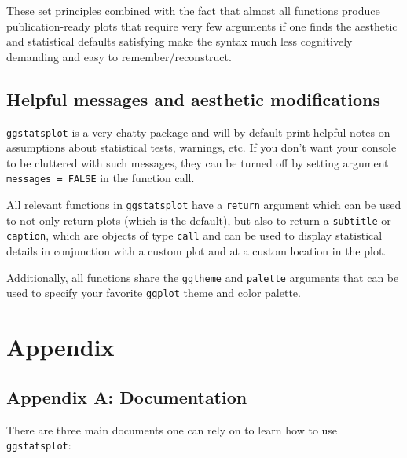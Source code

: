 \documentclass[]{article}
\begin{document}
These set principles combined with the fact that almost all functions
produce publication-ready plots that require very few arguments if one
finds the aesthetic and statistical defaults satisfying make the syntax
much less cognitively demanding and easy to remember/reconstruct.

\hypertarget{helpful-messages-and-aesthetic-modifications}{%
\subsection{Helpful messages and aesthetic
modifications}\label{helpful-messages-and-aesthetic-modifications}}

\texttt{ggstatsplot} is a very chatty package and will by default print
helpful notes on assumptions about statistical tests, warnings, etc. If
you don't want your console to be cluttered with such messages, they can
be turned off by setting argument \texttt{messages\ =\ FALSE} in the
function call.

All relevant functions in \texttt{ggstatsplot} have a \texttt{return}
argument which can be used to not only return plots (which is the
default), but also to return a \texttt{subtitle} or \texttt{caption},
which are objects of type \texttt{call} and can be used to display
statistical details in conjunction with a custom plot and at a custom
location in the plot.

Additionally, all functions share the \texttt{ggtheme} and
\texttt{palette} arguments that can be used to specify your favorite
\texttt{ggplot} theme and color palette.

\hypertarget{appendix}{%
\section{Appendix}\label{appendix}}

\hypertarget{appendix-a-documentation}{%
\subsection{Appendix A: Documentation}\label{appendix-a-documentation}}

There are three main documents one can rely on to learn how to use
\texttt{ggstatsplot}:
\end{document}
